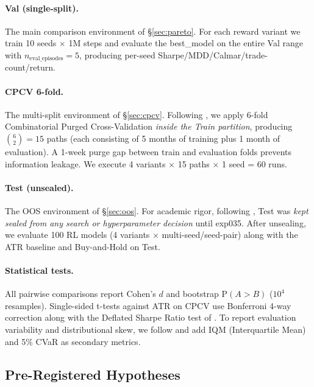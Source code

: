 \documentclass[11pt, a4paper]{article}
\begin{document}
\paragraph{Val (single-split).}
The main comparison environment of \S\ref{sec:pareto}. For each reward variant
we train 10 seeds $\times$ 1M steps and evaluate the best\_model on the entire
Val range with $n_{\text{eval\_episodes}}=5$, producing per-seed
Sharpe/MDD/Calmar/trade-count/return.

\paragraph{CPCV 6-fold.}
The multi-split environment of \S\ref{sec:cpcv}. Following
\citet{lopezdeprado2018advances}, we apply 6-fold Combinatorial Purged
Cross-Validation \emph{inside the Train partition}, producing
$\binom{6}{2}=15$ paths (each consisting of 5 months of training plus
1 month of evaluation). A 1-week purge gap between train and evaluation folds
prevents information leakage. We execute 4 variants $\times$ 15 paths $\times$
1 seed = 60 runs.

\paragraph{Test (unsealed).}
The OOS environment of \S\ref{sec:oos}. For academic rigor, following
\citet{gort2022backtest}, Test was \emph{kept sealed from any search or
hyperparameter decision} until exp035. After unsealing, we
evaluate 100 RL models (4 variants $\times$ multi-seed/seed-pair) along with
the ATR baseline and Buy-and-Hold on Test.

\paragraph{Statistical tests.}
All pairwise comparisons report Cohen's $d$ and bootstrap $\mathrm{P}(A > B)$
($10^4$ resamples). Single-sided t-tests against ATR on CPCV use Bonferroni
4-way correction along with the Deflated Sharpe Ratio test of
\citet{lopezdeprado2014dsr}. To report evaluation variability and distributional
skew, we follow \citet{henderson2018rlreproducibility} and add IQM
(Interquartile Mean) and 5\% CVaR as secondary metrics.

\subsection{Pre-Registered Hypotheses}
\label{sec:hypotheses}
\end{document}
